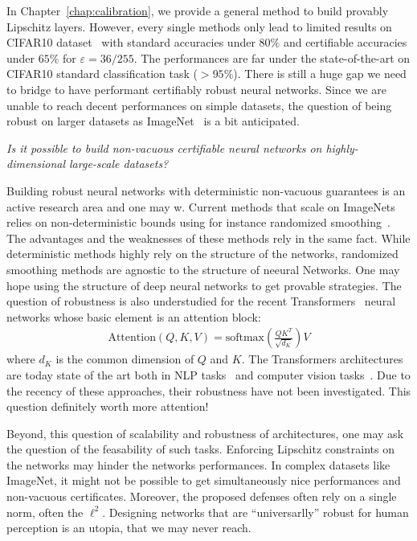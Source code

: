 In Chapter~\ref{chap:calibration}, we provide a general method to build provably Lipschitz layers. However, every single methods only lead to limited results on CIFAR10 dataset~\citep{cifar-10} with standard accuracies under $80\%$ and certifiable accuracies under $65\%$ for $\varepsilon=36/255$. The performances are far under the state-of-the-art on CIFAR10 standard classification task ($>95\%$). There is still a huge gap we need to bridge to have performant certifiably robust neural networks. Since we are unable to reach decent performances on simple datasets, the question of being robust on larger datasets as ImageNet~\citep{imagenet_cvpr09} is a bit anticipated.

\begin{tcolorbox}[colback=grund,colframe=rahmen]
    \begin{center}
        \emph{Is it possible to build non-vacuous certifiable neural networks on highly-dimensional large-scale datasets?}   
    \end{center}

\end{tcolorbox}

Building robust neural networks with deterministic non-vacuous guarantees is an active research area and one may w. Current methods that scale on ImageNets relies on non-deterministic bounds using for instance randomized smoothing~\citep{KolterRandomizedSmoothing,salman2019provably}. The advantages and the weaknesses of these methods rely in the same fact. While deterministic methods highly rely on the structure of the networks, randomized smoothing methods are agnostic to the structure of neeural Networks. One may hope using the structure of deep neural networks to get provable strategies. The question of robustness is also understudied for the recent Transformers~\citep{vaswani2017attention} neural networks whose basic element is an attention block:
\begin{align*}
    \text{Attention}(Q,K,V) = \text{softmax}\left(\frac{QK^T}{\sqrt{d_K}}\right)V
\end{align*}
where $d_K$ is the common dimension of $Q$ and $K$. The Transformers architectures are today state of the art both in NLP tasks~\citep{devlin2018bert} and computer vision tasks~\citep{dosovitskiy2020image}. Due to the recency of these approaches, their robustness have not been investigated. This question definitely worth more attention! 


Beyond, this question of scalability and robustness of architectures, one may ask the question of the feasability of such tasks. Enforcing Lipschitz constraints on the networks may hinder the networks performances. In complex datasets like ImageNet, it might not be possible to get simultaneously nice performances and non-vacuous certificates. Moreover, the proposed defenses often rely on a single norm, often the $\ell^2$. Designing networks that are ``universarlly'' robust for human perception  is an utopia, that we may never reach.  




